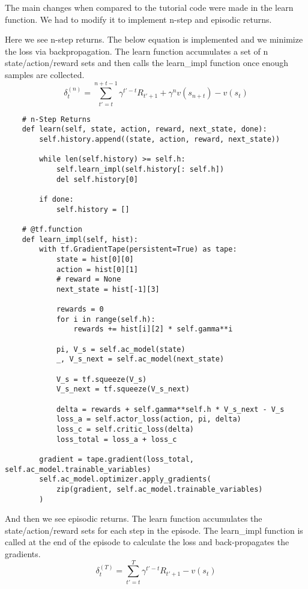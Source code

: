 \documentclass[A4]{article}
\begin{document}
    The main changes when compared to the tutorial code were made in the learn function.
    We had to modify it to implement n-step and episodic returns.

    Here we see n-step returns. The below equation is implemented and we minimize the loss via backpropagation.
    The learn function accumulates a set of n state/action/reward sets and then calls the learn\_impl function once enough samples are collected.
    \[
        \delta_t^{(n)}=\sum_{t'=t}^{n+t-1} \gamma^{t'-t} R_{t'+1}+\gamma^n v\left(s_{n+t}\right)-v\left(s_t\right)
    \]
    \begin{verbatim}
    # n-Step Returns
    def learn(self, state, action, reward, next_state, done):
        self.history.append((state, action, reward, next_state))

        while len(self.history) >= self.h:
            self.learn_impl(self.history[: self.h])
            del self.history[0]

        if done:
            self.history = []

    # @tf.function
    def learn_impl(self, hist):
        with tf.GradientTape(persistent=True) as tape:
            state = hist[0][0]
            action = hist[0][1]
            # reward = None
            next_state = hist[-1][3]

            rewards = 0
            for i in range(self.h):
                rewards += hist[i][2] * self.gamma**i

            pi, V_s = self.ac_model(state)
            _, V_s_next = self.ac_model(next_state)

            V_s = tf.squeeze(V_s)
            V_s_next = tf.squeeze(V_s_next)

            delta = rewards + self.gamma**self.h * V_s_next - V_s
            loss_a = self.actor_loss(action, pi, delta)
            loss_c = self.critic_loss(delta)
            loss_total = loss_a + loss_c

        gradient = tape.gradient(loss_total, self.ac_model.trainable_variables)
        self.ac_model.optimizer.apply_gradients(
            zip(gradient, self.ac_model.trainable_variables)
        )
    \end{verbatim}

    And then we see episodic returns.
    The learn function accumulates the state/action/reward sets for each step in the episode.
    The learn\_impl function is called at the end of the episode to calculate the loss and back-propagates the gradients.
    \[
        \delta_t^{(T)}=\sum_{t'=t}^T \gamma^{t'-t} R_{t'+1}-v\left(s_t\right)
    \]
\end{document}
